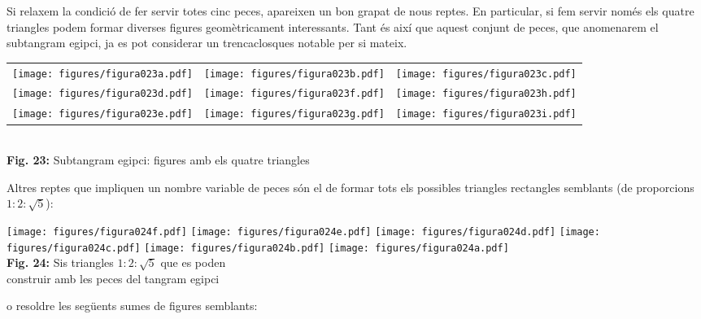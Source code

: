 \documentclass[a4paper,11pt]{article}
\begin{document}
\begin{multicols}{2}
            Si relaxem la condició de fer servir totes cinc peces, apareixen un bon grapat de nous reptes. En particular, si fem servir només els quatre triangles podem formar diverses figures geomètricament interessants. Tant és així que aquest conjunt de peces, que anomenarem el subtangram egipci, ja es pot considerar un trencaclosques notable per si mateix.

            \begin{center}
                \begin{tabular}{ccc}
                    \texttt{[image: figures/figura023a.pdf]} &
                    \texttt{[image: figures/figura023b.pdf]} &
                    \texttt{[image: figures/figura023c.pdf]} \\[3ex]
                    \texttt{[image: figures/figura023d.pdf]} &
                    \texttt{[image: figures/figura023f.pdf]} &
                    \texttt{[image: figures/figura023h.pdf]} \\[2ex]
                    \texttt{[image: figures/figura023e.pdf]} &
                    \texttt{[image: figures/figura023g.pdf]} &
                    \texttt{[image: figures/figura023i.pdf]} \\
                \end{tabular}\\
                \footnotesize{\textbf{Fig. 23:} Subtangram egipci: figures amb els quatre triangles}
            \end{center}

            Altres reptes que impliquen un nombre variable de peces són el de formar tots els possibles triangles rectangles semblants (de proporcions ${1:2:\sqrt{5}}$):

            \begin{center}
                \texttt{[image: figures/figura024f.pdf]}\quad
                \texttt{[image: figures/figura024e.pdf]}\quad
                \texttt{[image: figures/figura024d.pdf]}\quad
                \texttt{[image: figures/figura024c.pdf]}\quad
                \texttt{[image: figures/figura024b.pdf]}\quad
                \texttt{[image: figures/figura024a.pdf]}\\
                \footnotesize{\textbf{Fig. 24:} Sis triangles ${1:2:\sqrt{5}}$ que es poden\\ construir amb les peces del tangram egipci}
            \end{center}

            o resoldre les següents sumes de figures semblants:


\end{multicols}
\end{document}
